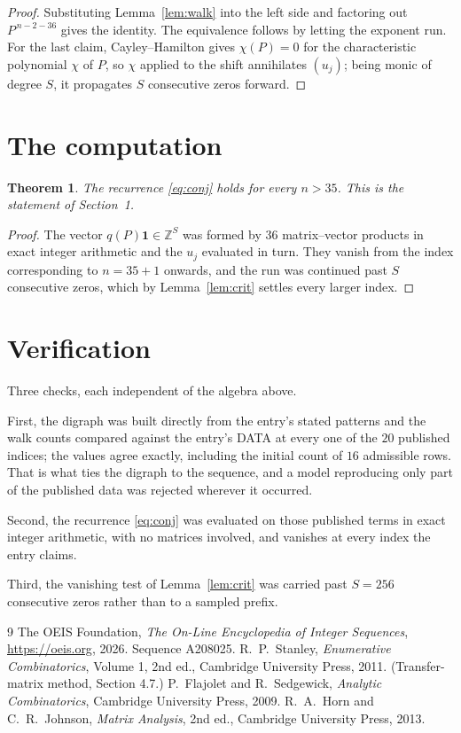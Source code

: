 \documentclass[11pt,a4paper]{article}
\theoremstyle{plain}
\newtheorem{theorem}{Theorem}
\theoremstyle{definition}
\begin{document}
\begin{proof}
Substituting Lemma~\ref{lem:walk} into the left side and factoring out
$P^{\,n-2-36}$ gives the identity. The equivalence follows by letting the exponent
run. For the last claim, Cayley--Hamilton gives $\chi(P)=0$ for the characteristic
polynomial $\chi$ of $P$, so $\chi$ applied to the shift annihilates $(u_j)$; being monic of
degree $S$, it propagates $S$ consecutive zeros forward.
\end{proof}

\section{The computation}

\begin{theorem}
The recurrence \eqref{eq:conj} holds for every $n>35$. This is the statement of
Section~1.
\end{theorem}

\begin{proof}
The vector $q(P)\mathbf{1}\in\mathbb{Z}^{S}$ was formed by $36$ matrix--vector
products in exact integer arithmetic and the $u_j$ evaluated in turn. They vanish from the
index corresponding to $n=35+1$ onwards, and the run was continued past $S$ consecutive
zeros, which by Lemma~\ref{lem:crit} settles every larger index.
\end{proof}

\section{Verification}

Three checks, each independent of the algebra above.

First, the digraph was built directly from the entry's stated patterns and the walk counts
compared against the entry's DATA at every one of the $20$ published indices; the
values agree exactly, including the initial count of $16$ admissible rows. That is
what ties the digraph to the sequence, and a model reproducing only part of the published
data was rejected wherever it occurred.

Second, the recurrence \eqref{eq:conj} was evaluated on those published terms in exact
integer arithmetic, with no matrices involved, and vanishes at every index the entry claims.

Third, the vanishing test of Lemma~\ref{lem:crit} was carried past $S=256$ consecutive
zeros rather than to a sampled prefix.

\begin{thebibliography}{9}
 The OEIS Foundation, \emph{The On-Line Encyclopedia of Integer
Sequences}, \url{https://oeis.org}, 2026. Sequence A208025.
 R.~P.~Stanley, \emph{Enumerative Combinatorics}, Volume 1, 2nd ed.,
Cambridge University Press, 2011. (Transfer-matrix method, Section 4.7.)
 P.~Flajolet and R.~Sedgewick, \emph{Analytic Combinatorics}, Cambridge
University Press, 2009.
 R.~A.~Horn and C.~R.~Johnson, \emph{Matrix Analysis}, 2nd ed., Cambridge
University Press, 2013.
\end{thebibliography}
\end{document}
